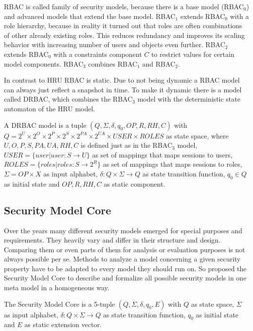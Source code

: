 \documentclass[twoside, openright, 12pt]{book}
\begin{document}
RBAC is called family of security models, because there is a base model (RBAC$_0$) and advanced models that extend the base model.
RBAC$_1$ extends RBAC$_0$ with a role hierarchy, because in reality it turned out that roles are often combinations of other already existing roles.
This reduces redundancy and improves its scaling behavior with increasing number of users and objects even further.
RBAC$_2$ extends RBAC$_0$ with a constraints component $C$ to restrict values for certain model components.
RBAC$_3$ combines RBAC$_1$ and RBAC$_2$.

In contrast to HRU RBAC is static.
Due to not being dynamic a RBAC model can always just reflect a snapshot in time.
To make it dynamic there is a model called DRBAC, which combines the RBAC$_3$ model with the deterministic state automaton of the HRU model.

\begin{xdefinition}[DRBAC] 
A DRBAC model is a tuple 
$(Q, \Sigma , \delta , q_{0}, OP, R, RH, C)$ with
$Q = 2^U \times 2^O \times 2^P \times 2^S \times 2^{\mathit{PA}} \times 2^{\mathit{UA}} \times \mathit{USER} \times \mathit{ROLES}$ as state space, where $U, O, P, S, PA, UA, RH, C$ is defined just as in the RBAC$_3$ model, 
$\mathit{USER} = \lbrace user|user: S \rightarrow U \rbrace$ as set of mappings that maps sessions to users, 
$\mathit{ROLES} = \lbrace roles|roles: S \rightarrow 2^R \rbrace$ as set of mappings that maps sessions to roles, 
$\Sigma = OP \times X$ as input alphabet, 
$\delta : Q \times \Sigma \rightarrow Q$ as state transition function, 
$q_0 \in Q$ as initial state and 
$OP, R, RH, C$ as static component.
\end{xdefinition}



\subsection{Security Model Core}
\label{model_core}
Over the years many different security models emerged for special purposes and requirements.
They heavily vary and differ in their structure and design.
Comparing them or even parts of them for analysis or evaluation purposes is not always possible per se.
Methods to analyze a model concerning a given security property have to be adapted to every model they should run on.
So \cite{Poelck14} proposed the Security Model Core to describe and formalize all possible security models in one meta model in a homogeneous way.

\begin{xdefinition}
\label{def:SecurityModelCore}
The Security Model Core is a 5-tuple 
$(Q, \Sigma , \delta , q_{0}, E)$ with 
$Q$ as state space,
$\Sigma$ as input alphabet, 
$\delta: Q \times \Sigma \rightarrow Q$ as state transition function, 
$q_0$ as initial state and 
$E$ as static extension vector.
\end{xdefinition}
\end{document}
